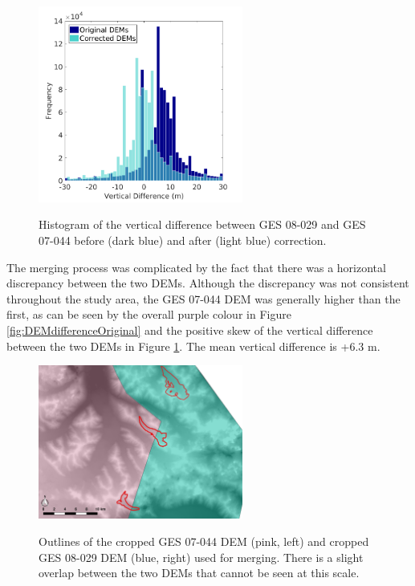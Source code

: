 \documentclass{sfuthesis}
\begin{document}
\begin{figure}
	\centering
	\includegraphics[width = 0.6\textwidth]{DEMcorrection_hist.png}\\
	\caption{Histogram of the vertical difference between GES 08-029 and GES 07-044 before (dark blue) and after (light blue) correction. }
	\label{fig:DEMcorrection_hist}
\end{figure}    
    

The merging process was complicated by the fact that there was a horizontal discrepancy between the two DEMs. Although the discrepancy was not consistent throughout the study area, the GES 07-044 DEM was generally higher than the first, as can be seen by the overall purple colour in Figure \ref{fig:DEMdifferenceOriginal} and the positive skew of the vertical difference between the two DEMs in Figure \ref{fig:DEMcorrection_hist}. The mean vertical difference is +6.3 m.


\begin{figure}
	\centering
	\includegraphics[width = 0.6\textwidth]{mergeLine.jpeg}\\
	\caption{Outlines of the cropped GES 07-044 DEM (pink, left) and cropped GES 08-029 DEM (blue, right) used for merging. There is a slight overlap between the two DEMs that cannot be seen at this scale.}
	\label{fig:mergeLine}
\end{figure}
\end{document}
